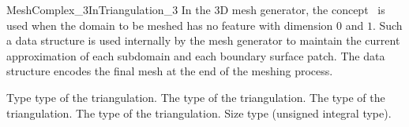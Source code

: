 \begin{ccRefConcept}{MeshComplex_3InTriangulation_3}
In the 3D mesh generator, the concept \ccRefName\ is used
when the domain to be meshed has no feature with dimension $0$ and $1$.
Such a data structure   is used internally by the mesh generator  to maintain
the current  approximation of each subdomain
and each boundary surface patch. 
The data structure encodes the final mesh at the end of the meshing process.





\ccTypes


\ccGlue
{}
{ Type   type of
the triangulation.}
\ccGlue
{}
{ The  type  of
the triangulation.}
\ccGlue
{}
{The  type of
the triangulation.}
\ccGlue
{}
{The  type of
the triangulation.}
\ccGlue
{}
{Size type (unsigned integral type).}





\end{ccRefConcept}
